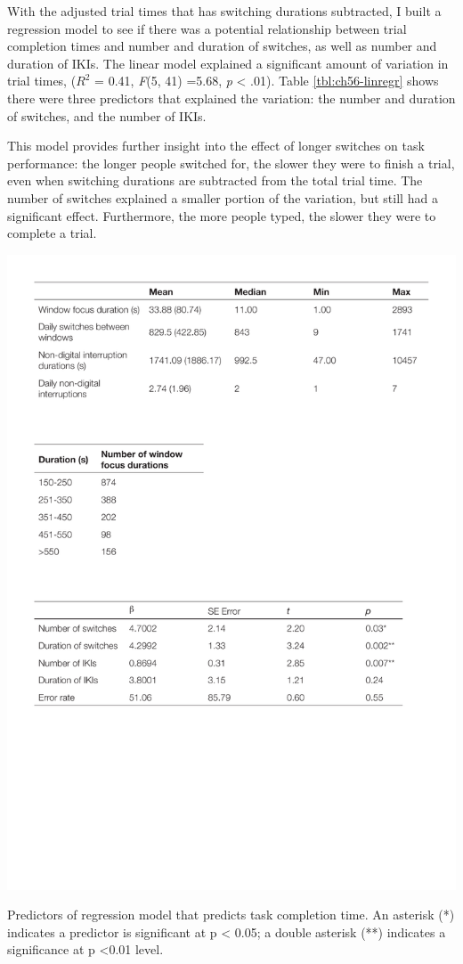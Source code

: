 With the adjusted trial times that has switching durations subtracted, I built a regression model to see if there was a potential relationship between trial completion times and number and duration of switches, as well as number and duration of IKIs. The linear model explained a significant amount of variation in trial times, ($R^2$ = 0.41, \textit{F}(5, 41) =5.68, \textit{p} < .01). Table \ref{tbl:ch56-linregr} shows there were three predictors that explained the variation: the number and duration of switches, and the number of IKIs. 

This model provides further insight into the effect of longer switches on task performance: the longer people switched for, the slower they were to finish a trial, even when switching durations are subtracted from the total trial time. The number of switches explained a smaller portion of the variation, but still had a significant effect. Furthermore, the more people typed, the slower they were to complete a trial.

\begin{table}
\centering
\centerline{\includegraphics[scale=0.8]{images/ch56/ch56-linregr.pdf}}
\caption[Study 6 regression model to predict task completion time]{Predictors of regression model that predicts task completion time. An asterisk (*) indicates a predictor is significant at p < 0.05; a double asterisk (**) indicates a significance at p <0.01 level.}
\label{tbl:ch56-linregr}
\end{table}


